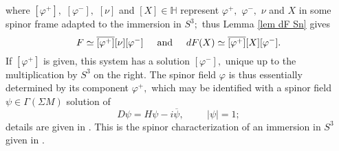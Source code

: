 \documentclass{amsart}
\begin{document}
where $[\varphi^+],$ $[\varphi^-],$ $[\nu]$ and $[X]\in{\mathbb{H}}$ represent $\varphi^+,$ $\varphi^-,$ $\nu$ and $X$ in some spinor frame adapted to the immersion in $S^3;$ thus Lemma \ref{lem dF Sn} gives
$$F\simeq\overline{[\varphi^+]}[\nu][\varphi^-]\hspace{.5cm}\mbox{and}\hspace{.5cm}dF(X)\simeq\overline{[\varphi^+]}[X][\varphi^-].$$
If $[\varphi^+]$ is given, this system has a solution $[\varphi^-],$ unique up to the multiplication by $S^3$ on the right. The spinor field $\varphi$ is thus essentially determined by its component $\varphi^+,$ which may be identified with a spinor field $\psi\in\Gamma(\Sigma M)$ solution of 
$$D\psi=H\psi-i\overline{\psi},\hspace{1cm}|\psi|=1;$$
details are given in \cite{BLR}. This is the spinor characterization of an immersion in $S^3$ given in \cite{Mo}.
\end{document}

